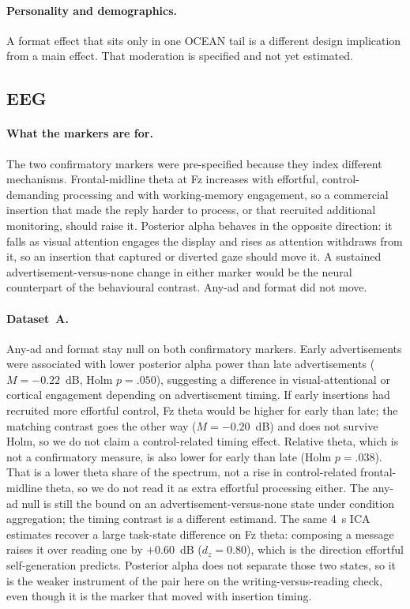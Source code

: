 \documentclass[english]{article}
\begin{document}
\paragraph{Personality and demographics.}
A format effect that sits only in one OCEAN tail is a different design implication from a main effect. That moderation is specified and not yet estimated.

\subsection{EEG}
\label{sec:disc-eeg}

\paragraph{What the markers are for.}
The two confirmatory markers were pre-specified because they index different mechanisms. Frontal-midline theta at Fz increases with effortful, control-demanding processing and with working-memory engagement, so a commercial insertion that made the reply harder to process, or that recruited additional monitoring, should raise it. Posterior alpha behaves in the opposite direction: it falls as visual attention engages the display and rises as attention withdraws from it, so an insertion that captured or diverted gaze should move it. A sustained advertisement-versus-none change in either marker would be the neural counterpart of the behavioural contrast. Any-ad and format did not move.

\paragraph{Dataset~A.}
Any-ad and format stay null on both confirmatory markers. Early advertisements were associated with lower posterior alpha power than late advertisements (\(M=-0.22\)~dB, Holm \(p=.050\)), suggesting a difference in visual-attentional or cortical engagement depending on advertisement timing. If early insertions had recruited more effortful control, Fz theta would be higher for early than late; the matching contrast goes the other way (\(M=-0.20\)~dB) and does not survive Holm, so we do not claim a control-related timing effect. Relative theta, which is not a confirmatory measure, is also lower for early than late (Holm \(p=.038\)). That is a lower theta share of the spectrum, not a rise in control-related frontal-midline theta, so we do not read it as extra effortful processing either. The any-ad null is still the bound on an advertisement-versus-none state under condition aggregation; the timing contrast is a different estimand. The same 4~s ICA estimates recover a large task-state difference on Fz theta: composing a message raises it over reading one by \(+0.60\)~dB (\(d_z=0.80\)), which is the direction effortful self-generation predicts. Posterior alpha does not separate those two states, so it is the weaker instrument of the pair here on the writing-versus-reading check, even though it is the marker that moved with insertion timing.
\end{document}
